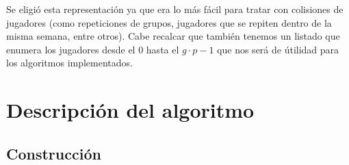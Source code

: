 \documentclass[letter, 10pt]{article}
\begin{document}
Se eligió esta representación ya que era lo más fácil para tratar con colisiones de jugadores (como repeticiones de grupos, jugadores que se repiten dentro de la misma semana, entre otros).
Cabe recalcar que también tenemos un listado que enumera los jugadores desde el $0$ hasta el $g\cdot p - 1$ que nos será de útilidad para los algoritmos implementados.

\section{Descripción del algoritmo} \label{algdesc}

\subsection{Construcción}
\end{document}
